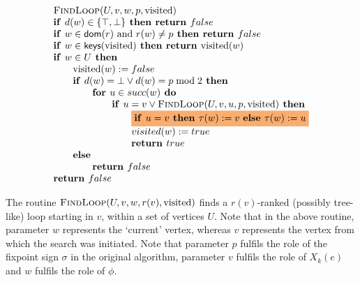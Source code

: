 \documentclass{article}
\newcommand{\Space}{\text{\ }}
\newcommand{\If}{\text{\textbf{if }}}
\newcommand{\Do}{\text{\textbf{ do }}}
\newcommand{\Then}{\text{\textbf{ then }}}
\newcommand{\Else}{\text{\textbf{else }}}
\newcommand{\For}{\text{\textbf{for }}}
\newcommand{\Return}{\text{\textbf{return }}}
\begin{document}
\begin{equation*}
\begin{array}{l}
\text{\textsc{FindLoop}}(U,v,w,p,\text{visited})\\  %
\If d(w) \in\{\top,\bot\} \textbf{ then return } false \\
\If w \in \mathsf{dom}(r) \text{ and } r(w) \neq p \textbf{ then return } false \\
\If w \in \mathsf{keys}(\text{visited}) \textbf{ then return } \text{visited}(w) \\
\If w \in U \Then \\
\qquad \text{visited}(w) := false\\
\qquad \If d(w) = \bot \lor d(w) = p \bmod 2 \Then \\
\qquad \qquad \For u \in succ(w) \Do \\
\qquad \qquad \qquad \If u = v \lor \textsc{FindLoop}(U,v, u, p, \text{visited}) \Then \\
\qquad \qquad \qquad \qquad \colorbox{Apricot}{$ \If u = v \Then \tau(w) := v \Space \Else \tau(w) := u $} \\
\qquad \qquad \qquad \qquad visited(w) := true \\
\qquad \qquad \qquad \qquad \Return true \\
\qquad \textbf{else } \\
\qquad \qquad \Return false \\
\textbf{return $false$}
\end{array}
\end{equation*}

The routine $\textsc{FindLoop}(U,v,w,r(v),\text{visited})$ finds a
$r(v)$-ranked (possibly tree-like) loop starting in $v$, within a set of vertices
$U$. Note that in the above routine, parameter $w$ represents the `current' vertex,
whereas $v$ represents the vertex from which the search was initiated.  Note that 
parameter $p$ fulfils the role
of the fixpoint sign $\sigma$ in the original algorithm, parameter $v$ fulfils
the role of $X_k(e)$ and $w$ fulfils the role of $\phi$. 
\end{document}
